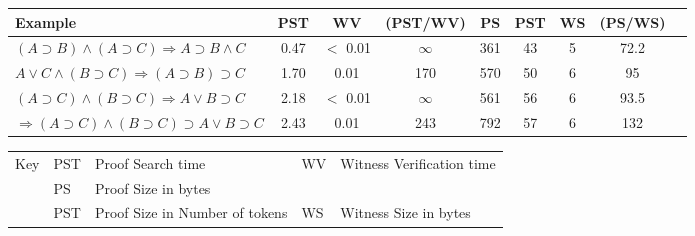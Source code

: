 \documentclass{llncs}
\begin{document}
\begin{table*}[htbp]
\begin{center}
\begin{small}
\begin{tabular}{|l|c|c|c|c|c|c|c|c|}
\hline
Example & PST & WV & (PST/WV) & PS & PST & WS & (PS/WS)\\
\hline
$(A\supset B)\wedge (A\supset C)\Rightarrow A\supset B\wedge C$
&       0.47 
&     $<$  0.01 
& $\infty$
&       361 
&       43 
&       5 
&       72.2\\
$A\vee C\wedge (B\supset C)\Rightarrow (A\supset B)\supset C$
&       1.70 
&       0.01
&       170 
&       570 
&       50 
&       6 
&       95\\
$(A\supset C)\wedge (B\supset C)\Rightarrow A\vee B\supset C$
&       2.18 
&      $<$ 0.01
&      $\infty$ 
&       561 
&       56 
&       6 
&       93.5\\
$\Rightarrow (A\supset C)\wedge (B\supset C)\supset A\vee B\supset C$
&       2.43 
&       0.01
&       243 
&       792 
&       57 
&       6 
&       132\\
\hline
\end{tabular}
\begin{tabular}{ll@{=}ll@{=}l}
Key & PST & Proof Search time 
&WV & Witness Verification time \\ 
&PS & Proof Size in bytes\\
&PST & Proof Size in Number of tokens 
&WS & Witness Size in bytes\\
\end{tabular} 
\end{small}
\end{center}
\caption{\label{tab:seqtimes}
Sequent Calculus: Times with Caching of User-Selected Predicates}
\end{table*}
\end{document}
